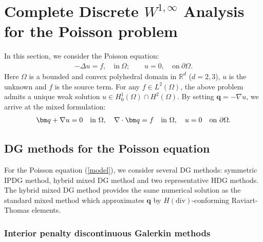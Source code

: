 \documentclass[1996/10/24]{amsart}
\theoremstyle{definition}
\numberwithin{equation}{section}
\begin{document}
\section{Complete Discrete $W^{1,\infty}$ Analysis for the Poisson problem}\label{sec3}
In this section, we consider the Poisson equation:
\begin{align}
\label{model}
-\Delta u=f,\quad \text{in}~\Omega; \quad \quad u=0,\quad \text{on}~\partial\Omega.
\end{align}
Here $\Omega$ is a bounded and convex polyhedral domain in $\mathbb{R}^{d}$ ($d=2,3$),
$u$ is the unknown and $f$ is the source term.
For any $f\in L^{2}(\Omega)$, the above problem admits a unique weak solution $u\in
H_0^1(\Omega)\cap H^2(\Omega)$.
By setting ${\bm q}=-\nabla u$, we arrive at the mixed formulation:
\begin{align}
\label{mixed}
{\bm q}+\nabla u=0\quad {\rm in}~\Omega,\quad \nabla\cdot{\bm q}=f\quad {\rm in}~\Omega,\quad
u=0\quad {\rm on}~\partial\Omega.
\end{align}

\subsection{DG methods for the Poisson equation}\label{sec3:1}
For the Poisson equation (\ref{model}), we consider several DG methods: symmetric
IPDG method, hybrid mixed DG method and two representative HDG methods. The hybrid mixed DG method provides the same numerical solution as the standard mixed method which approximates ${\bm q}$ by $H(\text{div})$-conforming Raviart-Thomas elements.

\subsubsection{Interior penalty discontinuous Galerkin methods}
\end{document}
